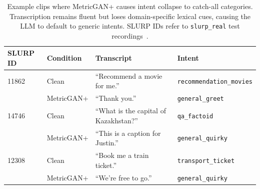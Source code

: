 \begin{table}[t]
  \centering
  \begin{tabular}{llll}
    \hline
    \textbf{SLURP ID} & \textbf{Condition} & \textbf{Transcript} &
    \textbf{Intent} \\
    \hline
    11862 & Clean & ``Recommend a movie for me.'' & \texttt{recommendation\_movies} \\
     & MetricGAN{+} & ``Thank you.'' & \texttt{general\_greet} \\
    \hline
    14746 & Clean & ``What is the capital of Kazakhstan?'' & \texttt{qa\_factoid} \\
     & MetricGAN{+} & ``This is a caption for Justin.'' & \texttt{general\_quirky} \\
    \hline
    12308 & Clean & ``Book me a train ticket.'' & \texttt{transport\_ticket} \\
     & MetricGAN{+} & ``We're free to go.'' & \texttt{general\_quirky} \\
    \hline
  \end{tabular}
  \caption{Example clips where MetricGAN{+} causes intent
    collapse to catch-all categories. Transcription remains
    fluent but loses domain-specific lexical cues, causing the
    LLM to default to generic intents. SLURP IDs refer to
    \texttt{slurp\_real} test recordings~\citep{bastianelli2020slurp}.}
  \label{tab:examples}
\end{table}